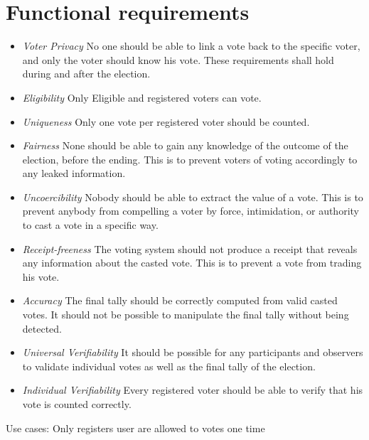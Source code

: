 \section{Functional requirements}
\begin{itemize}
    \item \textit{Voter Privacy}
        No one should be able to link a vote back to the specific voter, and only the voter should
        know his vote. These requirements shall hold during and after the election.  
    
    \item \textit{Eligibility}    
        Only Eligible and registered voters can vote. 
    
    \item \textit{Uniqueness}
        Only one vote per registered voter should be counted.
    
    \item \textit{Fairness}
        None should be able to gain any knowledge of the outcome of the election, before the ending. This is to prevent voters of voting accordingly to any leaked information. 
    
    \item \textit{Uncoercibility}
        Nobody should be able to extract the value of a vote. This is to prevent anybody from compelling a voter by force, intimidation, or authority to cast a vote in a specific way. 
    
    \item \textit{Receipt-freeness} 
        The voting system should not produce a receipt that reveals any information about the casted vote. This is to prevent a vote from trading his vote. 
    
    \item \textit{Accuracy} 
        The final tally should be correctly computed from valid casted votes. It should not be
        possible to manipulate the final tally without being detected. 
    
    \item \textit{Universal Verifiability}
        It should be possible for any participants and observers to validate individual votes as well as the final tally of the election. 
    
    \item \textit{Individual Verifiability}    
        Every registered voter should be able to verify that his vote is counted correctly. 
    
\end{itemize}
Use cases: Only registers user are allowed to votes one time